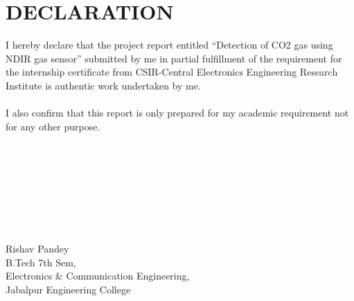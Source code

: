\documentclass[12pt]{article}
\begin{document}
\section{DECLARATION}
I hereby declare that the project report entitled “Detection of CO2 gas using NDIR gas sensor” submitted by me in partial fulfillment of the 
requirement for the internship certificate from CSIR-Central Electronics Engineering Research Institute is authentic work
undertaken by me.\\
\\
I also confirm that this report is only prepared for my academic requirement not for any other purpose.\\
\\
\\
\\
\\
\\
\\
\\
\\
Rishav Pandey\\
B.Tech 7th Sem,\\
Electronics \& Communication Engineering,\\
Jabalpur Engineering College

\clearpage


\end{document}
